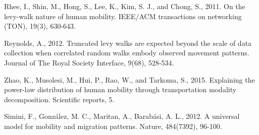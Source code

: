 \documentclass[10pt,letterpaper]{article}
\begin{document}
\begin{thebibliography}{10}
Rhee, I., Shin, M., Hong, S., Lee, K., Kim, S. J., and Chong, S., 2011. On the levy-walk nature of human mobility. IEEE/ACM transactions on networking (TON), 19(3), 630-643.

Reynolds, A., 2012. Truncated levy walks are expected beyond the scale of data collection when correlated random walks embody observed movement patterns. Journal of The Royal Society Interface, 9(68), 528-534.

Zhao, K., Musolesi, M., Hui, P., Rao, W., and Tarkoma, S., 2015. Explaining the power-law distribution of human mobility through transportation modality decomposition. Scientific reports, 5.

Simini, F., González, M. C., Maritan, A., Barabási, A. L., 2012. A universal model for mobility and migration patterns. Nature, 484(7392), 96-100.

%

\end{thebibliography}
\end{document}
